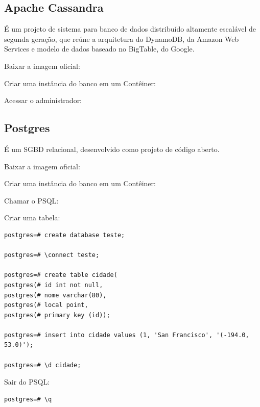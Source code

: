 \documentclass[a4paper,11pt]{article}
\begin{document}
\subsection{Apache Cassandra}
É um projeto de sistema para banco de dados distribuído altamente escalável de segunda geração, que reúne a arquitetura do DynamoDB, da Amazon Web Services e modelo de dados baseado no BigTable, do Google. 

Baixar a imagem oficial: \\

Criar uma instância do banco em um Contêiner: \\

Acessar o administrador: \\

\subsection{Postgres}
É um SGBD relacional, desenvolvido como projeto de código aberto. 

Baixar a imagem oficial: \\

Criar uma instância do banco em um Contêiner: \\

Chamar o PSQL: \\

Criar uma tabela:
\begin{lstlisting}[]
postgres=# create database teste;

postgres=# \connect teste;

postgres=# create table cidade(
postgres(# id int not null,
postgres(# nome varchar(80),
postgres(# local point,
postgres(# primary key (id));

postgres=# insert into cidade values (1, 'San Francisco', '(-194.0, 53.0)');

postgres=# \d cidade;
\end{lstlisting}

Sair do PSQL:
\begin{lstlisting}[]
postgres=# \q
\end{lstlisting}
\end{document}
